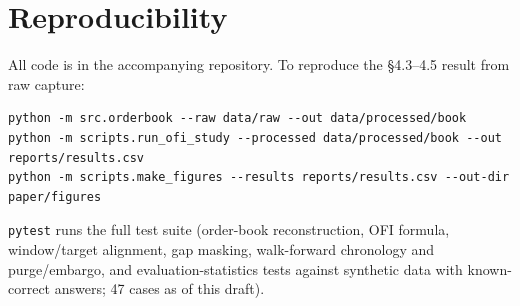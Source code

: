 \documentclass[11pt]{article}
\begin{document}
\section*{Reproducibility}

All code is in the accompanying repository. To reproduce the \S4.3--4.5 result from raw capture:

\begin{verbatim}
python -m src.orderbook --raw data/raw --out data/processed/book
python -m scripts.run_ofi_study --processed data/processed/book --out reports/results.csv
python -m scripts.make_figures --results reports/results.csv --out-dir paper/figures
\end{verbatim}

\texttt{pytest} runs the full test suite (order-book reconstruction, OFI formula, window/target alignment, gap masking, walk-forward chronology and purge/embargo, and evaluation-statistics tests against synthetic data with known-correct answers; 47 cases as of this draft).
\end{document}
